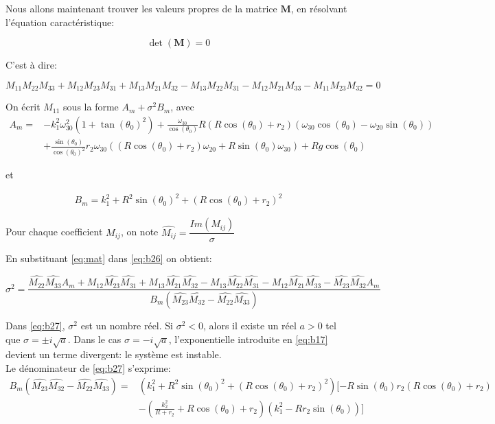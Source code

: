 Nous allons maintenant trouver les valeurs propres de la matrice $\mathbf{M}$, en résolvant l'équation caractéristique:

\begin{equation}
    \det(\mathbf{M})=0
\end{equation}

C'est à dire:

\begin{equation}
    M_{11} M_{22} M_{33} + M_{12} M_{23} M_{31} + M_{13} M_{21} M_{32} - M_{13} M_{22} M_{31} - M_{12} M_{21} M_{33} - M_{11} M_{23} M_{32} = 0
\label{eq:b26}
\end{equation}

On écrit $M_{11}$ sous la forme $A_m+\sigma^2 B_m$, avec 
\begin{align}
    A_m=&-k_1^2 \omega_{30}^2(1+\tan(\theta_0)^2)
    +\frac{\omega_{30}}{\cos(\theta_0)}R(R\cos(\theta_0)+r_2)(\omega_{30}\cos(\theta_0)-\omega_{20}\sin(\theta_0)) \\
    &+ \frac{\sin(\theta_0)}{\cos(\theta_0)^2} r_2 \omega_{30}((R\cos(\theta_0)+r_2)\omega_{20}+R\sin(\theta_0)\omega_{30})+Rg\cos(\theta_0) 
\end{align}
 
 et
 
 \begin{align}
    B_m= k_1^2+R^2\sin(\theta_0)^2+ (R\cos(\theta_0)+r_2)^2 
\end{align}

Pour chaque coefficient $M_{ij}$, on note $\hat{M_{ij}}=\dfrac{Im(M_{ij})}{\sigma}$

En substituant \ref{eq:mat} dans \ref{eq:b26} on obtient:

\begin{equation}
    \sigma^2=\frac{ \hat{M_{22}}\hat{M_{33}}A_m+M_{12}\hat{M_{23}}\hat{M_{31}}+M_{13}\hat{M_{21}}\hat{M_{32}}
    -M_{13}\hat{M_{22}}\hat{M_{31}}-M_{12}\hat{M_{21}}\hat{M_{33}}- \hat{M_{23}}\hat{M_{32}}A_m}{B_m(\hat{M_{23}}\hat{M_{32}}-\hat{M_{22}}\hat{M_{33}})}
\label{eq:b27}
\end{equation}


Dans \ref{eq:b27}, $\sigma^2$ est un nombre réel.
Si $\sigma^2<0$, alors il existe un réel $a>0$ tel que $\sigma=\pm i \sqrt{a}$. Dans le cas $\sigma=- i \sqrt{a}$, l'exponentielle introduite en \ref{eq:b17} devient un terme divergent: le système est instable. \\

Le dénominateur de \ref{eq:b27} s'exprime:
\begin{align}
        B_m(\hat{M_{23}}\hat{M_{32}}-\hat{M_{22}}\hat{M_{33}})=&(k_1^2+R^2\sin(\theta_0)^2+ (R\cos(\theta_0)+r_2)^2)[-R \sin(\theta_0)r_2 (R\cos(\theta_0)+r_2) \nonumber \\
        &-(\frac{k_2^2}{R+r_2} + R\cos(\theta_0)+r_2)(k_1^2-R r_2 \sin(\theta_0))]
\label{eq:b28}
\end{align}

